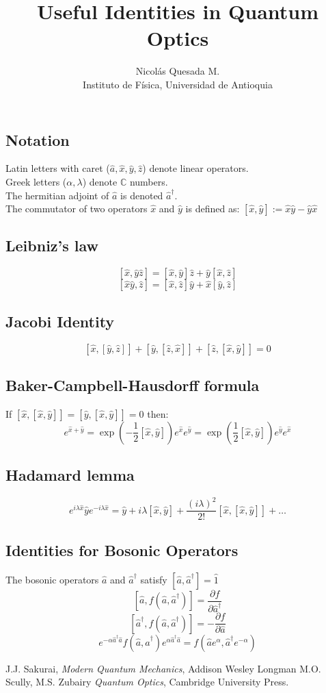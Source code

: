 \documentclass[11pt,letterpaper]{article}
\date{}
\title{Useful Identities in Quantum Optics}
\author{Nicol\'as Quesada M.\\{\small \sf Instituto de F\'isica, Universidad de Antioquia}}
\begin{document}
\maketitle
\thispagestyle{empty}

\subsection*{Notation}
Latin letters with caret ($\hat a, \hat x, \hat y, \hat z$) denote linear operators.\\
Greek letters ($\alpha, \lambda$) denote $\mathbb{C}$ numbers.\\
The hermitian adjoint of $\hat a$ is denoted $\hat a^{\dagger}$.\\
The commutator of two operators $\hat x$ and $\hat y$ is defined as:
$ [\hat x,\hat y] := \hat x \hat y-\hat y \hat x$ \\

\subsection*{Leibniz's law }
$$ [\hat x, \hat y \hat z]=[\hat x, \hat y] \hat z+\hat y[\hat x,\hat z] $$
$$ [\hat x \hat y, \hat z]=[\hat x, \hat z] \hat y+\hat x[\hat y,\hat z] $$

\subsection*{Jacobi Identity}
$$ [\hat x, [ \hat y, \hat z]]+[ \hat y,[ \hat z,\hat x]]+[\hat z, [\hat x, \hat y]]=0 $$
\subsection*{Baker-Campbell-Hausdorff formula}
If $[\hat x,[\hat x,\hat y]]=[\hat y,[\hat x,\hat y]]=0$ then:
$$e^{\hat x+\hat y}=\exp{\left(-\frac{1}{2} [\hat x,\hat y] \right)} e^{\hat x} e^{\hat y}=\exp{\left(\frac{1}{2} [\hat x,\hat y] \right)} e^{\hat y} e^{\hat x} $$

\subsection*{Hadamard lemma}
$$ e^{ i \lambda \hat x} \hat y e^{- i \lambda \hat x}=\hat y + i \lambda [\hat x,\hat y]+\frac{(i \lambda)^2}{2!}[\hat x,[\hat x,\hat y]]+\ldots$$

\subsection*{Identities for Bosonic Operators}
The bosonic operators $\hat a$ and $\hat a^\dagger$ satisfy $[\hat a,\hat a^\dagger]=\hat 1$
$$[\hat a,f(\hat a,\hat a^\dagger)]=\frac{\partial f}{\partial \hat a^\dagger}$$
$$[\hat a^\dagger,f(\hat a,\hat a^\dagger)]=-\frac{\partial f}{\partial \hat a}$$
$$e^{-\alpha \hat a^\dagger \hat a} f(\hat a,\hat a^\dagger) e^{\alpha \hat a^\dagger \hat a}=f(\hat a e^\alpha,\hat a^\dagger e^{-\alpha})$$

\begin{thebibliography}{}
\bibitem{} J.J. Sakurai, \textit{Modern Quantum Mechanics}, Addison Wesley Longman
\bibitem{} M.O. Scully, M.S. Zubairy \textit{Quantum Optics}, Cambridge University Press.
\end{thebibliography}
\end{document}
